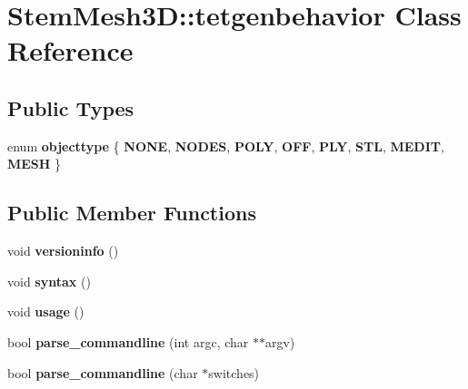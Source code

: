 \hypertarget{classStemMesh3D_1_1tetgenbehavior}{}\section{Stem\+Mesh3D\+:\+:tetgenbehavior Class Reference}
\label{classStemMesh3D_1_1tetgenbehavior}
\subsection*{Public Types}
\begin{DoxyCompactItemize}
\item 
\mbox{\label{classStemMesh3D_1_1tetgenbehavior_ac8e4019cecc31b874d9e9158f0e2bd44}} 
enum {\bfseries objecttype} \{ \newline
{\bfseries N\+O\+NE}, 
{\bfseries N\+O\+D\+ES}, 
{\bfseries P\+O\+LY}, 
{\bfseries O\+FF}, 
\newline
{\bfseries P\+LY}, 
{\bfseries S\+TL}, 
{\bfseries M\+E\+D\+IT}, 
{\bfseries M\+E\+SH}
 \}
\end{DoxyCompactItemize}
\subsection*{Public Member Functions}
\begin{DoxyCompactItemize}
\item 
\mbox{\label{classStemMesh3D_1_1tetgenbehavior_ad3285473cdc95097cdda3f692e0c7bff}} 
void {\bfseries versioninfo} ()
\item 
\mbox{\label{classStemMesh3D_1_1tetgenbehavior_a6d22d22681a304d75775632cf6c82376}} 
void {\bfseries syntax} ()
\item 
\mbox{\label{classStemMesh3D_1_1tetgenbehavior_a77f1ce68dd1adc91d6219320e4501af2}} 
void {\bfseries usage} ()
\item 
\mbox{\label{classStemMesh3D_1_1tetgenbehavior_a4fb9f0b29379a0213ba58f1cb2e970cf}} 
bool {\bfseries parse\+\_\+commandline} (int argc, char $\ast$$\ast$argv)
\item 
\mbox{\label{classStemMesh3D_1_1tetgenbehavior_a29807907a325d0d3b223187f1de368a0}} 
bool {\bfseries parse\+\_\+commandline} (char $\ast$switches)
\end{DoxyCompactItemize}
